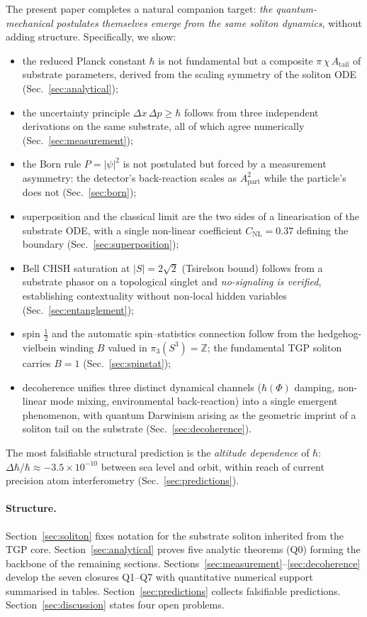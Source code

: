 \documentclass[11pt,a4paper]{article}
\renewcommand{\Phi}{\varPhi}
\newcommand{\Atail}{A_{\mathrm{tail}}}
\newcommand{\ApartSym}{A_{\mathrm{part}}}
\newcommand{\chiTGP}{\chi}
\newcommand{\Nwind}{B}
\newcommand{\pithreeS}{\pi_{3}(S^{3})}
\begin{document}
The present paper completes a natural companion target: \emph{the
quantum-mechanical postulates themselves emerge from the same soliton
dynamics}, without adding structure. Specifically, we show:
\begin{itemize}[leftmargin=1.4em,nosep]
\item the reduced Planck constant $\hbar$ is not fundamental but a
composite $\pi\,\chiTGP\,\Atail$ of substrate parameters, derived from
the scaling symmetry of the soliton ODE (Sec.~\ref{sec:analytical});
\item the uncertainty principle $\Delta x\,\Delta p\geq\hbar$ follows
from three independent derivations on the same substrate, all of
which agree numerically (Sec.~\ref{sec:measurement});
\item the Born rule $P=|\psi|^{2}$ is not postulated but forced by a
measurement asymmetry: the detector's back-reaction scales as
$\ApartSym^{2}$ while the particle's does not
(Sec.~\ref{sec:born});
\item superposition and the classical limit are the two sides of a
linearisation of the substrate ODE, with a single non-linear
coefficient $C_{\mathrm{NL}}=0.37$ defining the boundary
(Sec.~\ref{sec:superposition});
\item Bell CHSH saturation at $|S|=2\sqrt{2}$ (Tsirelson bound) follows
from a substrate phasor on a topological singlet and \emph{no-signaling
is verified}, establishing contextuality without non-local hidden
variables (Sec.~\ref{sec:entanglement});
\item spin $\tfrac{1}{2}$ and the automatic spin--statistics connection
follow from the hedgehog-vielbein winding $\Nwind$ valued in
$\pithreeS=\mathbb{Z}$; the fundamental TGP soliton carries
$\Nwind=1$ (Sec.~\ref{sec:spinstat});
\item decoherence unifies three distinct dynamical channels
($\hbar(\Phi)$ damping, non-linear mode mixing, environmental
back-reaction) into a single emergent phenomenon, with quantum
Darwinism arising as the geometric imprint of a soliton tail on the
substrate (Sec.~\ref{sec:decoherence}).
\end{itemize}

The most falsifiable structural prediction is the \emph{altitude
dependence} of $\hbar$:
$\Delta\hbar/\hbar\approx-3.5\times10^{-10}$ between sea level and
orbit, within reach of current precision atom interferometry
(Sec.~\ref{sec:predictions}).

\paragraph{Structure.}
Section~\ref{sec:soliton} fixes notation for the substrate soliton
inherited from the TGP core. Section~\ref{sec:analytical} proves five
analytic theorems (Q0) forming the backbone of the remaining sections.
Sections~\ref{sec:measurement}--\ref{sec:decoherence} develop the seven
closures Q1--Q7 with quantitative numerical support summarised in
tables. Section~\ref{sec:predictions} collects falsifiable predictions.
Section~\ref{sec:discussion} states four open problems.
\end{document}
